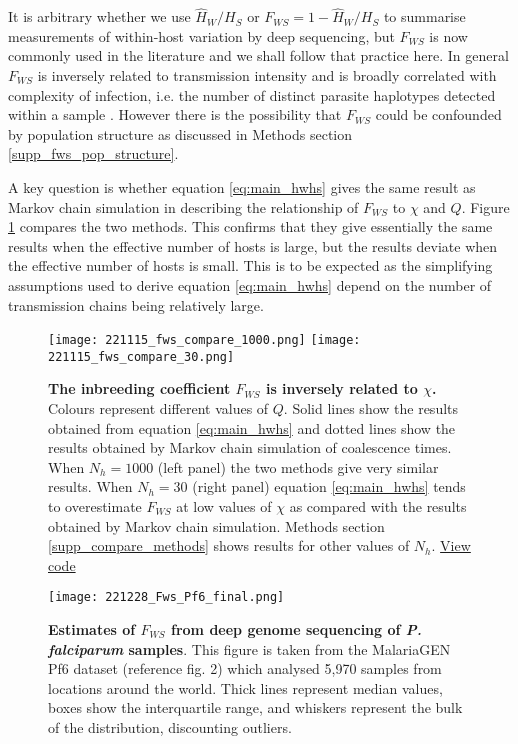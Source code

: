 \documentclass[_main.tex]{subfiles}
\begin{document}
It is arbitrary whether we use $\widehat{H}_W / H_S$ or $F_{WS} = 1 - \widehat{H}_W / H_S$ to summarise measurements of within-host variation by deep sequencing, but $F_{WS}$ is now commonly used in the literature and we shall follow that practice here.  In general $F_{WS}$ is inversely related to transmission intensity \cite{Auburn2012,Manske2012,MalariaGEN2021} and is broadly correlated with complexity of infection, i.e. the number of distinct parasite haplotypes detected within a sample \cite{Auburn2012}.  However there is the possibility that $F_{WS}$ could be confounded by population structure as discussed in Methods section \ref{supp_fws_pop_structure}.

A key question is whether equation \ref{eq:main_hwhs} gives the same result as Markov chain simulation in describing the relationship of $F_{WS}$ to $\chi$ and $Q$.  Figure \ref{fig:main_fws_compare_methods} compares the two methods.  This confirms that they give essentially the same results when the effective number of hosts is large, but the results deviate when the effective number of hosts is small.  This is to be expected as the simplifying assumptions used to derive equation \ref{eq:main_hwhs} depend on the number of transmission chains being relatively large.


\begin{figure}[h!]
\centering
\texttt{[image: 221115\_fws\_compare\_1000.png]}
\texttt{[image: 221115\_fws\_compare\_30.png]}
\caption{\textbf{The inbreeding coefficient $F_{WS}$ is inversely related to $\chi$.}  Colours represent different values of $Q$.  Solid lines show the results obtained from equation \ref{eq:main_hwhs} and dotted lines show the results obtained by Markov chain simulation of coalescence times.  When $N_h=1000$ (left panel) the two methods give very similar results.  When $N_h = 30$ (right panel) equation \ref{eq:main_hwhs} tends to overestimate $F_{WS}$ at low values of $\chi$ as compared with the results obtained by Markov chain simulation.  Methods section \ref{supp_compare_methods} shows results for other values of $N_h$.
\href{https://github.com/d-kwiat/gtg/blob/main/fws_compare_methods.ipynb}{View code}
}
\label{fig:main_fws_compare_methods}
\end{figure}


\begin{figure}[h!]
\centering
\texttt{[image: 221228\_Fws\_Pf6\_final.png]}
\caption{\textbf{Estimates of $F_{WS}$ from deep genome sequencing of \textit{P. falciparum} samples}.  This figure is taken from the MalariaGEN Pf6 dataset (reference \cite{MalariaGEN2021} fig. 2) which analysed 5,970 samples from locations around the world.  Thick lines represent median values, boxes show the interquartile range, and whiskers represent the bulk of the distribution, discounting outliers.  
}
\label{fig:Fws_Pf6_figure}
\end{figure}
\end{document}

